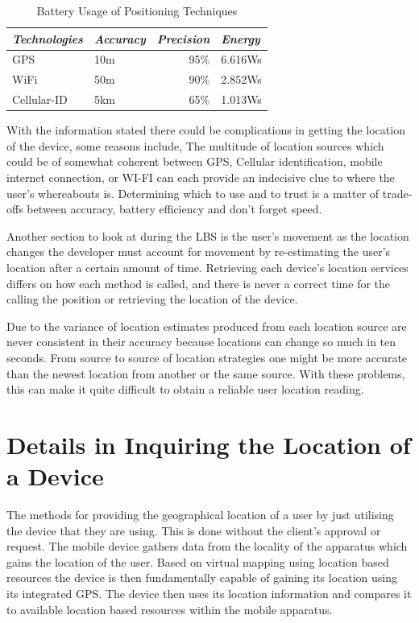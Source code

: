 \begin{table}[!ht]
    \centering
    \caption{Battery Usage of Positioning Techniques \cite{bareth2011energy}}
    \label{Battery Usage of Positioning Techniques}
    \begin{tabular}{@{}llrl@{}}
        \toprule
        \multicolumn{1}{c}{\textit{Technologies}} & \textit{Accuracy} & \textit{Precision} & \textit{Energy} \\ \midrule
        GPS & 10m & 95\% & 6.616Ws \\ \midrule
        WiFi & 50m & 90\% & 2.852Ws \\ \midrule
        Cellular-ID & 5km & 65\% & 1.013Ws \\ \bottomrule
    \end{tabular}
\end{table}

\par With the information stated there could be complications in getting the location of the device, some reasons include, The multitude of location sources which could be of somewhat coherent between GPS, Cellular identification, mobile internet connection, or WI-FI can each provide an indecisive clue to where the user's whereabouts is. Determining which to use and to trust is a matter of trade-offs between accuracy, battery efficiency and don't forget speed. \cite{sayed2005network}

\par Another section to look at during the LBS is the user's movement as the location changes the developer must account for movement by re-estimating the user's location after a certain amount of time. Retrieving each device's location services differs on how each method is called, and there is never a correct time for the calling the position or retrieving the location of the device.

\par Due to the variance of location estimates produced from each location source are never consistent in their accuracy because locations can change so much in ten seconds. From source to source of location strategies one might be more accurate than the newest location from another or the same source. With these problems, this can make it quite difficult to obtain a reliable user location reading.

\section{Details in Inquiring the Location of a Device}
The methods for providing the geographical location of a user by just utilising the device that they are using. This is done without the client's approval or request. The mobile device gathers data from the locality of the apparatus which gains the location of the user. Based on virtual mapping using location based resources the device is then fundamentally capable of gaining its location using its integrated GPS. The device then uses its location information and compares it to available location based resources within the mobile apparatus. \cite{rankin2005distributed}

